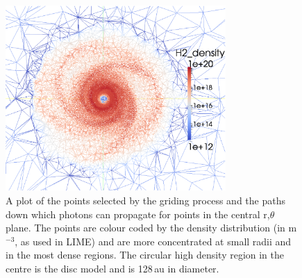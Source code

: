 \documentclass[useAMS,usenatbib]{mn2e}
\begin{document}
\begin{figure}
 \includegraphics[width=84mm]{Figures/model/lime2.eps}%
 \caption{A plot of the points selected by the griding process and the paths down which photons can propagate for points in the central r,$\theta$ plane. The points are colour coded by the density distribution (in m$^{-3}$, as used in LIME) and are more concentrated at small radii and in the most dense regions. The circular high density region in the centre is the disc model and is 128$\,$au in diameter.}
 \label{grid}
\end{figure}
\end{document}
